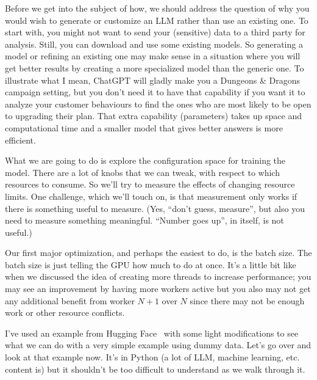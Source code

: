 Before we get into the subject of how, we should address the question of why you would wish to generate or customize an LLM rather than use an existing one. To start with, you might not want to send your (sensitive) data to a third party for analysis. Still, you can download and use some existing models. So generating a model or refining an existing one may make sense in a situation where you will get better results by creating a more specialized model than the generic one. To illustrate what I mean, ChatGPT will gladly make you a Dungeons \& Dragons campaign setting, but you don't need it to have that capability if you want it to analyze your customer behaviours to find the ones who are most likely to be open to upgrading their plan. That extra capability (parameters) takes up space and computational time and a smaller model that gives better answers is more efficient.

What we are going to do is explore the configuration space for training the model. There are a lot of knobs that we can tweak, with respect to which resources to consume. So we'll try to measure the effects of changing resource limits. One challenge, which we'll touch on, is that measurement only works if there is something useful to measure. (Yes, ``don't guess, measure'', but also you need to measure something meaningful. ``Number goes up'', in itself, is not useful.)

Our first major optimization, and perhaps the easiest to do, is the batch size. The batch size is just telling the GPU how much to do at once. It's a little bit like when we discussed the idea of creating more threads to increase performance; you may see an improvement by having more workers active but you also may not get any additional benefit from worker $N+1$ over $N$ since there may not be enough work or other resource conflicts.

I've used an example from Hugging Face~\cite{hf2} with some light modifications to see what we can do with a very simple example using dummy data. Let's go over and look at that example now. It's in Python (a lot of LLM, machine learning, etc. content is) but it shouldn't be too difficult to understand as we walk through it.

